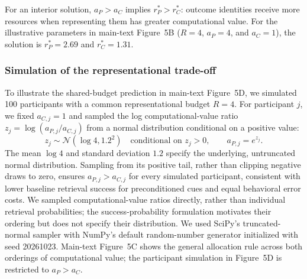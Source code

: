 \documentclass[12pt,letterpaper]{article}
\begin{document}
For an interior solution, $a_P>a_C$ implies $r_P^*>r_C^*$: outcome identities receive more resources when representing them has greater computational value. For the illustrative parameters in main-text Figure~5B ($R=4$, $a_P=4$, and $a_C=1$), the solution is $r_P^*=2.69$ and $r_C^*=1.31$.

\subsubsection*{Simulation of the representational trade-off}

To illustrate the shared-budget prediction in main-text Figure~5D, we simulated 100 participants with a common representational budget $R=4$. For participant $j$, we fixed $a_{C,j}=1$ and sampled the log computational-value ratio $z_j=\log(a_{P,j}/a_{C,j})$ from a normal distribution conditional on a positive value:
\begin{equation}
z_j\sim\mathcal{N}(\log 4,1.2^2)\quad\text{conditional on }z_j>0,\qquad a_{P,j}=e^{z_j}.
\tag{S7}
\end{equation}
The mean $\log 4$ and standard deviation $1.2$ specify the underlying, untruncated normal distribution. Sampling from its positive tail, rather than clipping negative draws to zero, ensures $a_{P,j}>a_{C,j}$ for every simulated participant, consistent with lower baseline retrieval success for preconditioned cues and equal behavioral error costs. We sampled computational-value ratios directly, rather than individual retrieval probabilities; the success-probability formulation motivates their ordering but does not specify their distribution. We used SciPy's truncated-normal sampler with NumPy's default random-number generator initialized with seed 20261023. Main-text Figure~5C shows the general allocation rule across both orderings of computational value; the participant simulation in Figure~5D is restricted to $a_P>a_C$.
\end{document}
